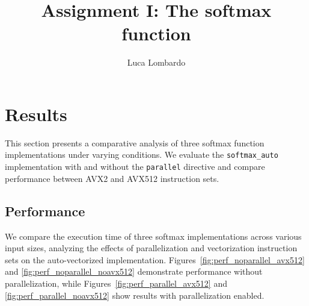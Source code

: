 \documentclass[10pt]{article}
\title{Assignment I: The softmax function}
\author{Luca Lombardo}
\date{}
\begin{document}
\maketitle


\setlength{\parindent}{0em}

\section*{Results}
This section presents a comparative analysis of three softmax function implementations under varying conditions. We evaluate the \texttt{softmax\_auto} implementation with and without the \texttt{parallel} directive and compare performance between AVX2 and AVX512 instruction sets.


\subsection*{Performance}

We compare the execution time of three softmax implementations across various input sizes, analyzing the effects of parallelization and vectorization instruction sets on the auto-vectorized implementation. Figures~\ref{fig:perf_noparallel_avx512} and \ref{fig:perf_noparallel_noavx512} demonstrate performance without parallelization, while Figures~\ref{fig:perf_parallel_avx512} and \ref{fig:perf_parallel_noavx512} show results with parallelization enabled.
\end{document}
